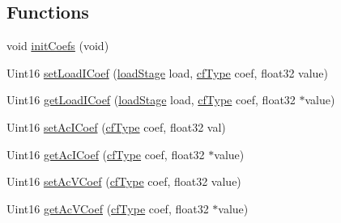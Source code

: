 \subsection*{Functions}
\begin{DoxyCompactItemize}
\item 
void \hyperlink{a00014_a91a941a20fc5a9465397d4701e0beaf4}{init\-Coefs} (void)
\item 
Uint16 \hyperlink{a00014_ac551a1fee10631510b139d6d97bb166c}{set\-Load\-I\-Coef} (\hyperlink{a00027_a2820f1e18d921d2f1e97d53404b9fbae}{load\-Stage} load, \hyperlink{a00014_ac340fbbc5919954c173757935549588f}{cf\-Type} coef, float32 value)
\item 
Uint16 \hyperlink{a00014_a86bea9827291d6230b0f3366bbd8ce27}{get\-Load\-I\-Coef} (\hyperlink{a00027_a2820f1e18d921d2f1e97d53404b9fbae}{load\-Stage} load, \hyperlink{a00014_ac340fbbc5919954c173757935549588f}{cf\-Type} coef, float32 $\ast$value)
\item 
Uint16 \hyperlink{a00014_a8f635eee5f9c27a4f7d4349334b5ee78}{set\-Ac\-I\-Coef} (\hyperlink{a00014_ac340fbbc5919954c173757935549588f}{cf\-Type} coef, float32 val)
\item 
Uint16 \hyperlink{a00014_a766238d36085cd55f37f88fd8b2bb110}{get\-Ac\-I\-Coef} (\hyperlink{a00014_ac340fbbc5919954c173757935549588f}{cf\-Type} coef, float32 $\ast$value)
\item 
Uint16 \hyperlink{a00014_acaa99aafbcfaf6399a815e094c431474}{set\-Ac\-V\-Coef} (\hyperlink{a00014_ac340fbbc5919954c173757935549588f}{cf\-Type} coef, float32 value)
\item 
Uint16 \hyperlink{a00014_ad3161240a1aa23145fcba9506cb9001c}{get\-Ac\-V\-Coef} (\hyperlink{a00014_ac340fbbc5919954c173757935549588f}{cf\-Type} coef, float32 $\ast$value)
\end{DoxyCompactItemize}
